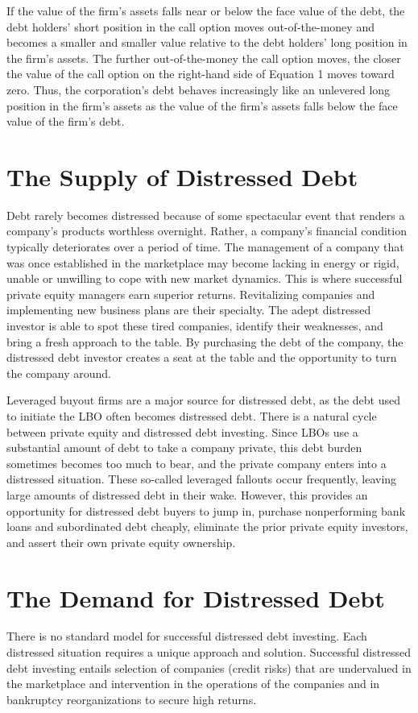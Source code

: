 \documentclass[11pt]{article}
\begin{document}
If the value of the firm's assets falls near or below the face value of the debt, the debt holders' short position in the call option moves out-of-the-money and becomes a smaller and smaller value relative to the debt holders' long position in the firm's assets. The further out-of-the-money the call option moves, the closer the value of the call option on the right-hand side of Equation 1 moves toward zero. Thus, the corporation's debt behaves increasingly like an unlevered long position in the firm's assets as the value of the firm's assets falls below the face value of the firm's debt.

\section*{The Supply of Distressed Debt}
Debt rarely becomes distressed because of some spectacular event that renders a company's products worthless overnight. Rather, a company's financial condition typically deteriorates over a period of time. The management of a company that was once established in the marketplace may become lacking in energy or rigid, unable or unwilling to cope with new market dynamics. This is where successful private equity managers earn superior returns. Revitalizing companies and implementing new business plans are their specialty. The adept distressed investor is able to spot these tired companies, identify their weaknesses, and bring a fresh approach to the table. By purchasing the debt of the company, the distressed debt investor creates a seat at the table and the opportunity to turn the company around.

Leveraged buyout firms are a major source for distressed debt, as the debt used to initiate the LBO often becomes distressed debt. There is a natural cycle between private equity and distressed debt investing. Since LBOs use a substantial amount of debt to take a company private, this debt burden sometimes becomes too much to bear, and the private company enters into a distressed situation. These so-called leveraged fallouts occur frequently, leaving large amounts of distressed debt in their wake. However, this provides an opportunity for distressed debt buyers to jump in, purchase nonperforming bank loans and subordinated debt cheaply, eliminate the prior private equity investors, and assert their own private equity ownership.

\section*{The Demand for Distressed Debt}
There is no standard model for successful distressed debt investing. Each distressed situation requires a unique approach and solution. Successful distressed debt investing entails selection of companies (credit risks) that are undervalued in the marketplace and intervention in the operations of the companies and in bankruptcy reorganizations to secure high returns.
\end{document}
